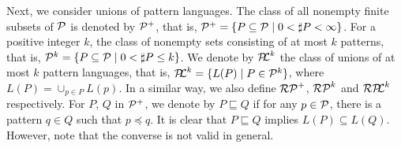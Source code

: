 Next, we consider unions of pattern languages. %
The class of all nonempty finite subsets of $\mathcal{P}$ is denoted by $\mathcal{P}^{+}$, that is,
$\mathcal{P}^{+} = \{P \subseteq \mathcal{P} \mid 0 < \sharp P < \infty\}$.
For a positive integer $k$, the class of nonempty sets consisting of at most $k$ patterns, that is,
$\mathcal{P}^{k} = \{P \subseteq \mathcal{P} \mid 0 < \sharp P \leq k\}$.
We denote by $\mathcal{P\!\!L}^{k}$ the class of unions of at most $k$ pattern languages,
that is, $\mathcal{P\!\!L}^{k} = \{L(P) \mid P \in \mathcal{P}^{k}\}$,
where $L(P) = \cup_{p \in P}L(p)$.
In a similar way, we also define $\mathcal{RP}^{+}$, $\mathcal{RP}^{k}$ and $\mathcal{RP\!\!L}^{k}$ respectively.
%
For $P$, $Q$ in $\mathcal{P}^{+}$,
we denote by $P \sqsubseteq Q$ if for any $p \in \mathcal{P}$, there is a pattern $q \in Q$ such that $p \preceq q$.
It is clear that $P \sqsubseteq Q$ implies $L(P) \subseteq L(Q)$.
However, note that the converse is not valid in general.

